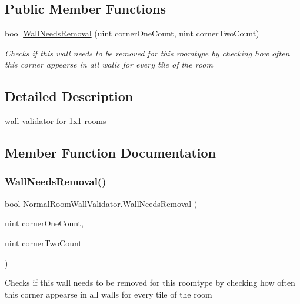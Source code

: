 \subsection*{Public Member Functions}
\begin{DoxyCompactItemize}
\item 
bool \mbox{\hyperlink{class_normal_room_wall_validator_a30c0496c8203077f3c327da93f38f7c7}{Wall\+Needs\+Removal}} (uint corner\+One\+Count, uint corner\+Two\+Count)
\begin{DoxyCompactList}\small\item\em Checks if this wall needs to be removed for this roomtype by checking how often this corner appearse in all walls for every tile of the room \end{DoxyCompactList}\end{DoxyCompactItemize}


\subsection{Detailed Description}
wall validator for 1x1 rooms 



\subsection{Member Function Documentation}
\mbox{\label{class_normal_room_wall_validator_a30c0496c8203077f3c327da93f38f7c7}} 
\subsubsection{\texorpdfstring{Wall\+Needs\+Removal()}{WallNeedsRemoval()}}
{\footnotesize\ttfamily bool Normal\+Room\+Wall\+Validator.\+Wall\+Needs\+Removal (\begin{DoxyParamCaption}\item[{uint}]{corner\+One\+Count,  }\item[{uint}]{corner\+Two\+Count }\end{DoxyParamCaption})}



Checks if this wall needs to be removed for this roomtype by checking how often this corner appearse in all walls for every tile of the room 

